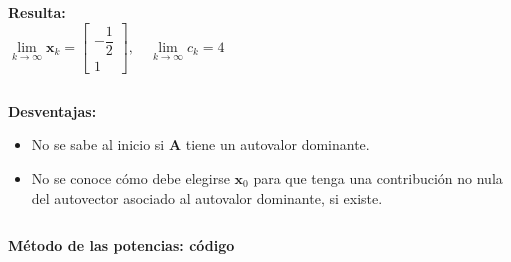 \documentclass[9pt, aspectratio=169]{beamer}
\begin{document}
\begin{frame}
\begin{columns}[t]
		\textbf{Resulta:}
		\[ \lim_{k \rightarrow \infty} \bm{x}_k = \begin{bmatrix} -\dfrac{1}{2} \\ 1 \end{bmatrix}, \quad \lim_{k \rightarrow \infty} c_k = 4 \]
	\end{columns}
	\hrulefill \pause

	\textbf{Desventajas:}
	\begin{itemize}
		\item No se sabe al inicio si $\bm{A}$ tiene un autovalor dominante.
		\item No se conoce cómo debe elegirse $\bm{x}_0$ para que tenga una contribución no nula del autovector asociado al autovalor dominante, si existe.
	\end{itemize}
\end{frame}

\begin{frame}[fragile]

	\begin{columns}[t]
		\textbf{Método de las potencias: código}


	\end{columns}
\end{frame}
\end{document}
